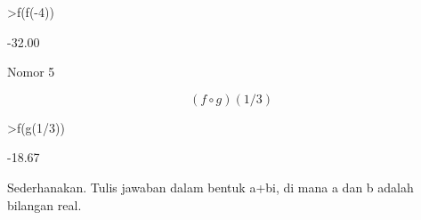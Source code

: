 \documentclass[12pt,arial,letterpaper]{book}
\begin{document}
\begin{eulercomment}
\begin{eulercomment}
\begin{eulercomment}
\begin{eulercomment}
\begin{eulercomment}
\begin{eulercomment}
\begin{eulercomment}
\begin{eulercomment}
\begin{eulercomment}
\begin{eulercomment}
\begin{eulercomment}
\begin{eulercomment}
\begin{eulercomment}
\begin{eulercomment}
\begin{eulerprompt}
>f(f(-4))
\end{eulerprompt}
\begin{euleroutput}
       -32.00 
\end{euleroutput}
\begin{eulercomment}
Nomor 5\\
\end{eulercomment}
\begin{eulerformula}
\[
(f \circ g)(1/3)
\]
\end{eulerformula}
\begin{eulerprompt}
>f(g(1/3))
\end{eulerprompt}
\begin{euleroutput}
       -18.67 
\end{euleroutput}
\begin{eulercomment}
Sederhanakan. Tulis jawaban dalam bentuk a+bi, di mana a dan b adalah
bilangan real.


\end{eulercomment}
\end{eulercomment}
\end{eulercomment}
\end{eulercomment}
\end{eulercomment}
\end{eulercomment}
\end{eulercomment}
\end{eulercomment}
\end{eulercomment}
\end{eulercomment}
\end{eulercomment}
\end{eulercomment}
\end{eulercomment}
\end{eulercomment}
\end{eulercomment}
\end{document}
